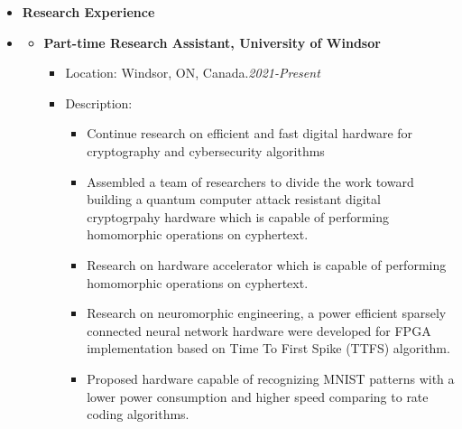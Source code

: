 \begin {itemize} \item [] {\bf \Large  Research Experience }  \vspace{-1.5em}
\item []  {\bf \hrulefill } \mdseries \normalsize 
    \begin {itemize}
        \item [$\bullet$] \bf {\mtf \normalsize  Part-time Research Assistant, University of Windsor} \mdseries
            \begin {itemize}
                \item [-]  {  Location:  Windsor, ON, Canada.\small \hspace{5.4cm}\textit{2021-Present}\normalsize} 
                \item [-]   {   Description:} 
                         \begin {itemize}
                                \item [\textbullet] Continue research on efficient and fast digital hardware for cryptography and cybersecurity algorithms
                                \item [\textbullet] Assembled a team of researchers to divide the work toward building a quantum computer attack resistant digital cryptogrpahy hardware which is capable of performing homomorphic operations on cyphertext.
                                \item [\textbullet] Research on hardware accelerator which is capable of performing homomorphic operations on cyphertext.
                                \item [\textbullet] Research on neuromorphic engineering, a power efficient sparsely  connected neural network  hardware were  developed for FPGA implementation  based on Time To First Spike (TTFS) algorithm. 
            \item [\textbullet] Proposed hardware capable of recognizing MNIST patterns with a lower power consumption and higher  speed comparing to rate coding algorithms. 
                                

\end{itemize}
\end{itemize}
\end{itemize}
\end{itemize}
